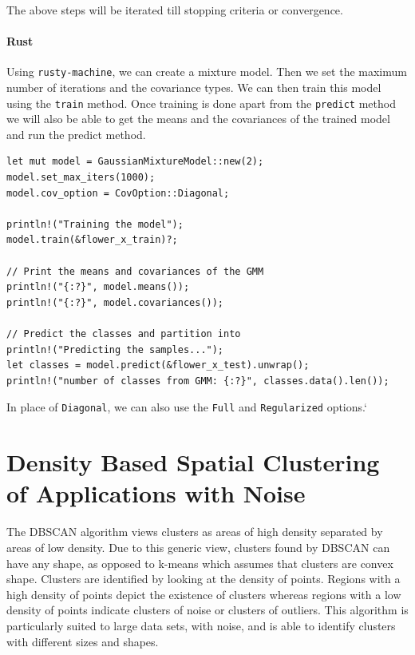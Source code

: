 \documentclass{book}
\begin{document}
The above steps will be iterated till stopping criteria or convergence.

\paragraph{Rust}%
Using \lstinline{rusty-machine}, we can create a mixture model. Then we set the maximum number of iterations and the covariance types. We can then train this model using the \lstinline{train} method. Once training is done apart from the \lstinline{predict} method we will also be able to get the means and the covariances of the trained model and run the predict method.

\begin{lstlisting}[caption={rusty\_machine\_unsupervised}]
let mut model = GaussianMixtureModel::new(2);
model.set_max_iters(1000);
model.cov_option = CovOption::Diagonal;

println!("Training the model");
model.train(&flower_x_train)?;

// Print the means and covariances of the GMM
println!("{:?}", model.means());
println!("{:?}", model.covariances());

// Predict the classes and partition into
println!("Predicting the samples...");
let classes = model.predict(&flower_x_test).unwrap();
println!("number of classes from GMM: {:?}", classes.data().len());
\end{lstlisting}

In place of \lstinline{Diagonal}, we can also use the \lstinline{Full} and \lstinline{Regularized} options.`
\label{par:rust}






\label{sec:gaussian_mixture_model}

\section{Density Based Spatial Clustering of Applications with Noise}%
The DBSCAN algorithm views clusters as areas of high density separated by areas of low density. Due to this generic view, clusters found by DBSCAN can have any shape, as opposed to k-means which assumes that clusters are convex shape. Clusters are identified by looking at the density of points. Regions with a high density of points depict the existence of clusters whereas regions with a low density of points indicate clusters of noise or clusters of outliers. This algorithm is particularly suited to large data sets, with noise, and is able to identify clusters with different sizes and shapes.
\end{document}
